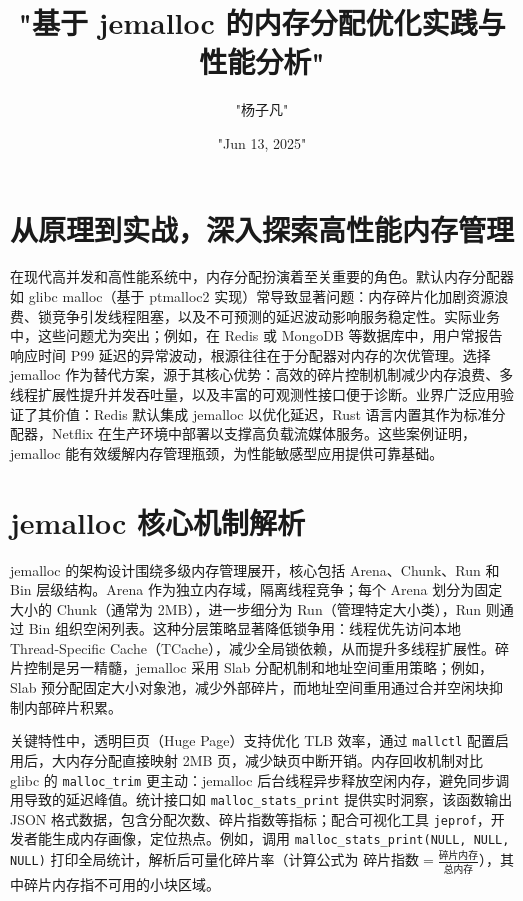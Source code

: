 \title{"基于 jemalloc 的内存分配优化实践与性能分析"}
\author{"杨子凡"}
\date{"Jun 13, 2025"}
\maketitle
\chapter{从原理到实战，深入探索高性能内存管理}
在现代高并发和高性能系统中，内存分配扮演着至关重要的角色。默认内存分配器如 glibc malloc（基于 ptmalloc2 实现）常导致显著问题：内存碎片化加剧资源浪费、锁竞争引发线程阻塞，以及不可预测的延迟波动影响服务稳定性。实际业务中，这些问题尤为突出；例如，在 Redis 或 MongoDB 等数据库中，用户常报告响应时间 P99 延迟的异常波动，根源往往在于分配器对内存的次优管理。选择 jemalloc 作为替代方案，源于其核心优势：高效的碎片控制机制减少内存浪费、多线程扩展性提升并发吞吐量，以及丰富的可观测性接口便于诊断。业界广泛应用验证了其价值：Redis 默认集成 jemalloc 以优化延迟，Rust 语言内置其作为标准分配器，Netflix 在生产环境中部署以支撑高负载流媒体服务。这些案例证明，jemalloc 能有效缓解内存管理瓶颈，为性能敏感型应用提供可靠基础。\par
\chapter{jemalloc 核心机制解析}
jemalloc 的架构设计围绕多级内存管理展开，核心包括 Arena、Chunk、Run 和 Bin 层级结构。Arena 作为独立内存域，隔离线程竞争；每个 Arena 划分为固定大小的 Chunk（通常为 2MB），进一步细分为 Run（管理特定大小类），Run 则通过 Bin 组织空闲列表。这种分层策略显著降低锁争用：线程优先访问本地 Thread-Specific Cache（TCache），减少全局锁依赖，从而提升多线程扩展性。碎片控制是另一精髓，jemalloc 采用 Slab 分配机制和地址空间重用策略；例如，Slab 预分配固定大小对象池，减少外部碎片，而地址空间重用通过合并空闲块抑制内部碎片积累。\par
关键特性中，透明巨页（Huge Page）支持优化 TLB 效率，通过 \texttt{mallctl} 配置启用后，大内存分配直接映射 2MB 页，减少缺页中断开销。内存回收机制对比 glibc 的 \texttt{malloc\_{}trim} 更主动：jemalloc 后台线程异步释放空闲内存，避免同步调用导致的延迟峰值。统计接口如 \texttt{malloc\_{}stats\_{}print} 提供实时洞察，该函数输出 JSON 格式数据，包含分配次数、碎片指数等指标；配合可视化工具 \texttt{jeprof}，开发者能生成内存画像，定位热点。例如，调用 \texttt{malloc\_{}stats\_{}print(NULL, NULL, NULL)} 打印全局统计，解析后可量化碎片率（计算公式为 $\text{碎片指数} = \frac{\text{碎片内存}}{\text{总内存}}$），其中碎片内存指不可用的小块区域。\par
